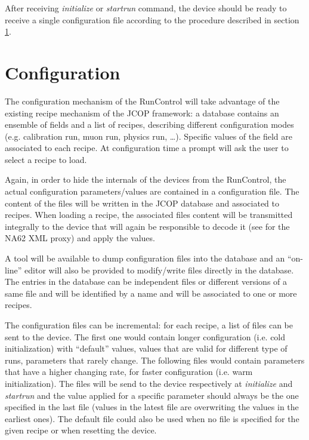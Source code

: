 \documentclass[a4paper]{article}
\begin{document}
After receiving \textit{initialize} or \textit{startrun} command, the device
should be ready to receive a single configuration file according to the
procedure described in section \ref{sec:configuration}.

\section{Configuration}\label{sec:configuration}
The configuration mechanism of the RunControl will take advantage of the existing recipe mechanism
of the JCOP\cite{biblio:JCOP} framework: a database contains an ensemble of fields and a list of
recipes, describing different configuration modes (e.g. calibration run, muon
run, physics run, \ldots). Specific values of the field are associated to each
recipe. At configuration time a prompt will ask the user to select a recipe to load.

Again, in order to hide the internals of the devices from the RunControl, the actual configuration
parameters/values are contained in a configuration file. The content of the files will be written in
the JCOP database and associated to recipes. When loading a recipe, the associated files content
will be transmitted integrally to the device that will again be responsible to
decode it (see \cite{biblio:XMLProxy} for the NA62 XML proxy) and apply the
values.

A tool will be available to dump configuration files into the database and an ``on-line'' editor will
also be provided to modify/write files directly in the database. The entries in the database can be
independent files or different versions of a same file and will be identified by a name and will
be associated to one or more recipes.

The configuration files can be incremental: for each recipe, a list of files can be sent to the
device. The first one would contain longer configuration (i.e. cold
initialization) with ``default'' values, values that are valid for different
type of runs, parameters that rarely change. The following files would contain
parameters that have a higher changing rate, for faster configuration (i.e.
warm initialization). The files will be send to the device respectively at
\textit{initialize} and \textit{startrun} and the value applied for a specific
parameter should always be the one specified in the last file (values in the
latest file are overwriting the values in the earliest ones). The default file
could also be used when no file is specified for the given recipe or when
resetting the device.
\end{document}
